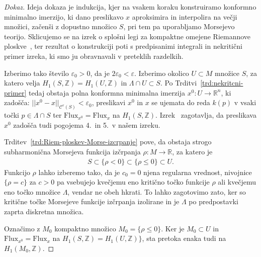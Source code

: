 \documentclass[12pt,a4paper,twoside]{article}
\theoremstyle{definition} %
\newenvironment{dokaz}[1][Dokaz]{\begin{proof}[#1]}{\end{proof}}
\theoremstyle{plain} %
\numberwithin{equation}{section}  %
\newcommand{\R}{\mathbb R}
\begin{document}
\begin{dokaz}
Ideja dokaza je indukcija, kjer na vsakem koraku konstruiramo konformno minimalno imerzijo, ki dano preslikavo $x$ aproksimira in interpolira na večji množici, začenši z dopustno množico $S$, pri tem pa uporabljamo Morsejevo teorijo. 
Sklicujemo se na izrek o splošni legi za kompaktne omejene Riemannove ploskve~\cite[Theorem~3.4.1]{alarcon2021minimal},
ter rezultat o konstrukciji poti s predpisanimi integrali in nekritični primer izreka, ki smo ju obravnavali v preteklih razdelkih.

Izberimo tako število $\varepsilon_0 > 0$, da je $2 \varepsilon_0 < \varepsilon$.
Izberimo okolico $U \subset M$ množice $S$, za katero velja $H_{1}(S, \mathbb{Z}) = H_{1}(U, \mathbb{Z})$ in $\Lambda \cap U \subset S$.
Po Trditvi~\ref{trd:nekritcni-primer} tedaj obstaja polna konformna minimalna imerzija $x^{0} \colon U \to \mathbb{R}^{n}$, ki zadošča:
$ ||x^{0}-x||_{\mathcal{C}^{r}(S)} < \varepsilon_0$, preslikavi $x^{0}$ in $x$ se ujemata do reda $k(p)$ v vsaki točki $p \in \Lambda \cap S$ ter $ \text{Flux}_{x^{0}} = \text{Flux}_{x}$ na $H_{1}(S, \mathbb{Z})$.
Izrek~\cite[Theorem~3.4.1~(b),(c)]{alarcon2021minimal}
zagotavlja, da preslikava $x^{0}$ zadošča tudi pogojema 4.~in 5.~v našem izreku.

Trditev~\ref{trd:Riem-ploskev-Morse-izcrpanje} pove, da obstaja strogo subharmonična Morsejeva funkcija izčrpanja $\rho \colon M \to \R$, za katero je
\begin{gather*}
S \subset \{ \rho < 0 \} \subset \{ \rho \leq 0 \} \subset U.
\end{gather*}
Funkcijo $\rho$ lahko izberemo tako, da je $c_0 = 0$ njena regularna vrednost, nivojnice $\{ \rho = c \}$ za $c>0$ pa vsebujejo kvečjemu eno kritično točko funkcije $\rho$ ali kvečjemu eno točko množice $\Lambda$, vendar ne obeh hkrati. To lahko zagotovimo zato, ker so kritične točke Morsejeve funkcije izčrpanja izolirane in je $\Lambda$ po predpostavki zaprta diskretna množica.

Označimo z $M_{0}$ kompaktno množico $M_{0} = \{ \rho \leq 0 \}$.
Ker je $M_{0} \subset U$ in $\text{Flux}_{x^{0}} = \text{Flux}_{x}$ na $H_{1}(S, \mathbb{Z}) = H_{1}(U, \mathbb{Z}) \}$, sta pretoka enaka tudi na $H_{1}(M_{0}, \mathbb{Z})$.


\end{dokaz}
\end{document}
